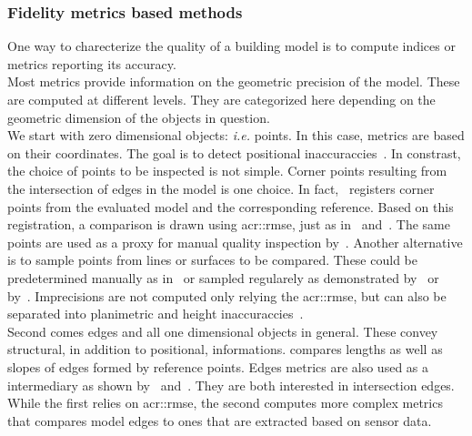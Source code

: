         \subsubsection{Fidelity metrics based methods}
            One way to charecterize the quality of a building model is to compute indices or metrics reporting its accuracy.\\

            Most metrics provide information on the geometric precision of the model.
            These are computed at different levels.
            They are categorized here depending on the geometric dimension of the objects in question.\\
            We start with zero dimensional objects: \textit{i.e.} points.
            In this case, metrics are based on their coordinates.
            The goal is to detect positional inaccuraccies~\parencite{kaartinen2005accuracy}.
            In constrast, the choice of points to be inspected is not simple.
            Corner points resulting from the intersection of edges in the model is one choice.
            In fact,~\textcite{zeng2014multicriteria} registers corner points from the evaluated model and the corresponding reference.
            Based on this registration, a comparison is drawn using \gls{acr::rmse}, just as in~\parencite{landes2012quality} and~\parencite{you2011quality}.
            The same points are used as a proxy for manual quality inspection by~\textcite{elberink2011quality}.
            Another alternative is to sample points from lines or surfaces to be compared.
            These could be predetermined manually as in~\textcite{kaartinen2005accuracy} or sampled regularely as demonstrated by~\textcite{vogtle2003quality} or by~\textcite{tran2019geometric}.
            Imprecisions are not computed only relying the \gls{acr::rmse}, but can also be separated into planimetric and height inaccuraccies~\parencite{vogtle2003quality, kaartinen2005accuracy, jaynes2003recognition}.\\
            Second comes edges and all one dimensional objects in general.
            These convey structural, in addition to positional, informations.
            \textcite{kaartinen2005accuracy} compares lengths as well as slopes of edges formed by reference points.
            Edges metrics are also used as a intermediary as shown by~\textcite{elberink2011quality} and~\textcite{michelin2013quality}.
            They are both interested in intersection edges.
            While the first relies on \gls{acr::rmse}, the second computes more complex metrics that compares model edges to ones that are extracted based on sensor data.\\
